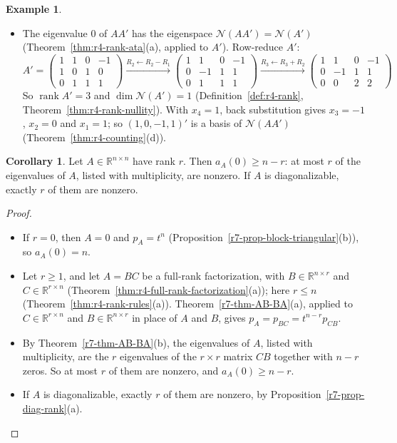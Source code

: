 \documentclass[12pt]{article}
\newcommand{\R}{\mathbb R}
\DeclareMathOperator{\rank}{rank}
\theoremstyle{definition}
\newtheorem{corollary}[theorem]{Corollary}
\newtheorem{example}[theorem]{Example}
\begin{document}
\begin{example}
\begin{itemize}
\item The eigenvalue \(0\) of \(AA'\) has the eigenspace \(\mathcal N(AA')=\mathcal N(A')\)
(Theorem~\ref{thm:r4-rank-ata}(a), applied to \(A'\)). Row-reduce \(A'\):
\[
A'=\begin{pmatrix}1&1&0&-1\\1&0&1&0\\0&1&1&1\end{pmatrix}
\xrightarrow{R_2\leftarrow R_2-R_1}
\begin{pmatrix}1&1&0&-1\\0&-1&1&1\\0&1&1&1\end{pmatrix}
\xrightarrow{R_3\leftarrow R_3+R_2}
\begin{pmatrix}1&1&0&-1\\0&-1&1&1\\0&0&2&2\end{pmatrix}
\]
So \(\rank A'=3\) and \(\dim\mathcal N(A')=1\) (Definition~\ref{def:r4-rank}, Theorem~\ref{thm:r4-rank-nullity}). With
\(x_4=1\), back substitution gives \(x_3=-1\), \(x_2=0\) and \(x_1=1\); so \((1,0,-1,1)'\) is a basis of
\(\mathcal N(AA')\) (Theorem~\ref{thm:r4-counting}(d)).
\end{itemize}
\end{example}

\begin{corollary}\label{r7-cor-rank-eigen}
Let \(A\in\R^{n\times n}\) have rank \(r\). Then \(a_A(0)\geqslant n-r\): at most \(r\) of the eigenvalues of \(A\), listed
with multiplicity, are nonzero. If \(A\) is diagonalizable, exactly \(r\) of them are nonzero.
\end{corollary}
\begin{proof}
\begin{itemize}
\item If \(r=0\), then \(A=0\) and \(p_A=t^n\) (Proposition~\ref{r7-prop-block-triangular}(b)), so \(a_A(0)=n\).
\item Let \(r\geqslant1\), and let \(A=BC\) be a full-rank factorization, with \(B\in\R^{n\times r}\) and \(C\in\R^{r\times n}\)
(Theorem~\ref{thm:r4-full-rank-factorization}(a)); here \(r\leqslant n\) (Theorem~\ref{thm:r4-rank-rules}(a)).
Theorem~\ref{r7-thm-AB-BA}(a), applied to \(C\in\R^{r\times n}\) and \(B\in\R^{n\times r}\) in place of \(A\) and \(B\), gives
\(p_A=p_{BC}=t^{n-r}p_{CB}\).
\item By Theorem~\ref{r7-thm-AB-BA}(b), the eigenvalues of \(A\), listed with multiplicity, are the \(r\) eigenvalues of
the \(r\times r\) matrix \(CB\) together with \(n-r\) zeros. So at most \(r\) of them are nonzero, and \(a_A(0)\geqslant n-r\).
\item If \(A\) is diagonalizable, exactly \(r\) of them are nonzero, by Proposition~\ref{r7-prop-diag-rank}(a).\qedhere
\end{itemize}
\end{proof}
\end{document}
